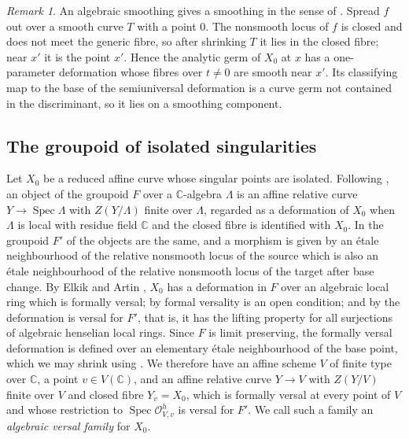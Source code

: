 \documentclass{amsart}
\theoremstyle{definition}
\theoremstyle{remark}
\newtheorem{remark}[theorem]{Remark}
\numberwithin{equation}{section}
\newcommand{\C}{\mathbb{C}}
\DeclareMathOperator{\Spec}{Spec}
\begin{document}
\begin{remark}\label{rem:stevens-smoothable}
An algebraic smoothing gives a smoothing in the sense of \cite{Ste}. Spread $f$ out over a smooth curve $T$ with a point $0$. The nonsmooth locus of $f$ is closed and does not meet the generic fibre, so after shrinking $T$ it lies in the closed fibre; near $x'$ it is the point $x'$. Hence the analytic germ of $X_0$ at $x$ has a one-parameter deformation whose fibres over $t\ne0$ are smooth near $x'$. Its classifying map to the base of the semiuniversal deformation is a curve germ not contained in the discriminant, so it lies on a smoothing component.
\end{remark}

\subsection{The groupoid of isolated singularities}
Let $X_0$ be a reduced affine curve whose singular points are isolated. Following \cite[Example~4.5]{Art}, an object of the groupoid $F$ over a $\C$-algebra $\Lambda$ is an affine relative curve $Y\to\Spec\Lambda$ with $Z(Y/\Lambda)$ finite over $\Lambda$, regarded as a deformation of $X_0$ when $\Lambda$ is local with residue field $\C$ and the closed fibre is identified with $X_0$. In the groupoid $F'$ of \cite[Example~4.5]{Art} the objects are the same, and a morphism is given by an \'etale neighbourhood of the relative nonsmooth locus of the source which is also an \'etale neighbourhood of the relative nonsmooth locus of the target after base change. By Elkik \cite[\S\S 1--3]{Elk} and Artin \cite[Corollary~3.2 and Example~4.5]{Art}, $X_0$ has a deformation in $F$ over an algebraic local ring which is formally versal; by \cite[Theorem~4.4]{Art} formal versality is an open condition; and by \cite[Example~4.5 and Theorem~3.3]{Art} the deformation is versal for $F'$, that is, it has the lifting property \cite[(3.1)]{Art} for all surjections of algebraic henselian local rings. Since $F$ is limit preserving, the formally versal deformation is defined over an elementary \'etale neighbourhood of the base point, which we may shrink using \cite[Theorem~4.4]{Art}. We therefore have an affine scheme $V$ of finite type over $\C$, a point $v\in V(\C)$, and an affine relative curve $Y\to V$ with $Z(Y/V)$ finite over $V$ and closed fibre $Y_v=X_0$, which is formally versal at every point of $V$ and whose restriction to $\Spec\mathcal O^h_{V,v}$ is versal for $F'$. We call such a family an \emph{algebraic versal family} for $X_0$.
\end{document}
